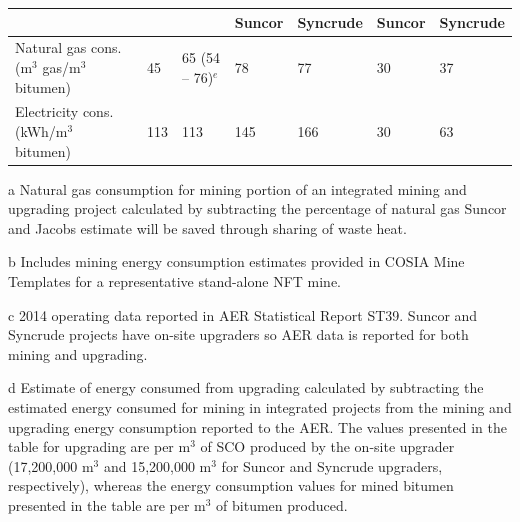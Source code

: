 \documentclass[11pt]{report}
\begin{document}
\begin{landscape}
\begin{table}
\begin{scriptsize}
\tablelasttail{\bottomrule}
\label{tab:mining_comp_integration}
\begin{threeparttable}
\begin{supertabular*}{1\columnwidth}{p{0.3\columnwidth}p{0.08\columnwidth}p{0.08\columnwidth}p{0.08\columnwidth}p{0.08\columnwidth} p{0.08\columnwidth}p{0.08\columnwidth}}
				&		&				& Suncor	& Syncrude	& Suncor	& Syncrude \\	
				\midrule
Natural gas cons. 
(m$^3$ gas/m$^3$ bitumen)	& 45		& 65 (54 -- 76)$^{e}$		& 78		& 77		&	30 	& 37  \\
Electricity	cons. (kWh/m$^3$ bitumen)	& 113	& 113			& 145	& 166		& 	30	& 63 \\
\end{supertabular*}
\begin{tablenotes}
\item[a] Natural gas consumption for mining portion of an integrated mining and upgrading project calculated by subtracting the percentage of natural gas Suncor and Jacobs \cite{Jacobs2012} estimate will be saved through sharing of waste heat. 
\item[b] Includes mining energy consumption estimates provided in COSIA Mine Templates for a representative stand-alone NFT mine.
\item[c] 2014 operating data reported in AER Statistical Report ST39. Suncor and Syncrude projects have on-site upgraders so AER data is reported for both mining and upgrading.
\item[d] Estimate of energy consumed from upgrading calculated by subtracting the estimated energy consumed for mining in integrated projects from the mining and upgrading energy consumption reported to the AER. The values presented in the table for upgrading are per m$^3$ of SCO produced by the on-site upgrader (17,200,000 m$^3$ and 15,200,000 m$^3$ for Suncor and Syncrude upgraders, respectively), whereas the energy consumption values for mined bitumen presented in the table are per m$^3$ of bitumen produced.

\end{tablenotes}
\end{threeparttable}
\end{scriptsize}
\end{table}
\end{landscape}
\end{document}
